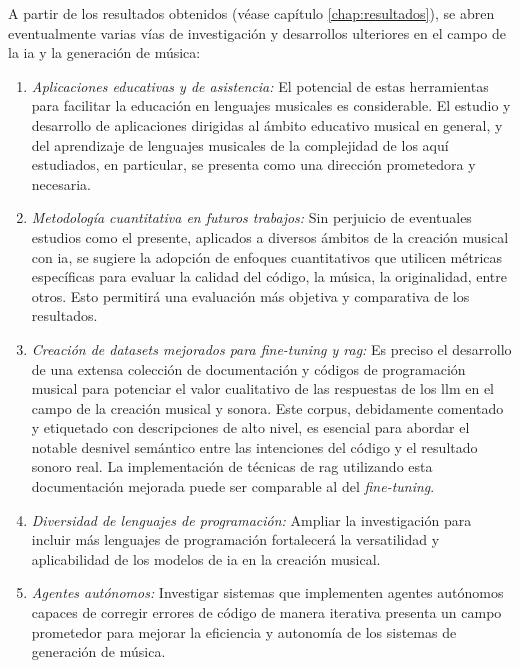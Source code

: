 A partir de los resultados obtenidos (véase capítulo \ref{chap:resultados}), se abren eventualmente varias vías de investigación y desarrollos ulteriores en el campo de la \gls{ia} y la generación de música:

\begin{enumerate}
\item \textit{Aplicaciones educativas y de asistencia:} El potencial de estas herramientas para facilitar la educación en lenguajes musicales es considerable. El estudio y desarrollo de aplicaciones dirigidas al ámbito educativo musical en general, y del aprendizaje de lenguajes musicales de la complejidad de los aquí estudiados, en particular, se presenta como una dirección prometedora y necesaria.

\item \textit{Metodología cuantitativa en futuros trabajos:} Sin perjuicio de eventuales estudios como el presente, aplicados a diversos ámbitos de la creación musical con \gls{ia}, se sugiere la adopción de enfoques cuantitativos que utilicen métricas específicas para evaluar la calidad del código, la música, la originalidad, entre otros. Esto permitirá una evaluación más objetiva y comparativa de los resultados.

\item \textit{Creación de datasets mejorados para \emph{fine-tuning} y \gls{rag}:} Es preciso el desarrollo de una extensa colección de documentación y códigos de programación musical para potenciar el valor cualitativo de las respuestas de los \gls{llm} en el campo de la creación musical y sonora. Este corpus, debidamente comentado y etiquetado con descripciones de alto nivel, es esencial para abordar el notable desnivel semántico entre las intenciones del código y el resultado sonoro real. La implementación de técnicas de \gls{rag} utilizando esta documentación mejorada puede ser comparable al del \emph{fine-tuning}.

\item \textit{Diversidad de lenguajes de programación:} Ampliar la investigación para incluir más lenguajes de programación fortalecerá la versatilidad y aplicabilidad de los modelos de \gls{ia} en la creación musical.

\item \textit{Agentes autónomos:} Investigar sistemas que implementen agentes autónomos capaces de corregir errores de código de manera iterativa presenta un campo prometedor para mejorar la eficiencia y autonomía de los sistemas de generación de música.


\end{enumerate}
